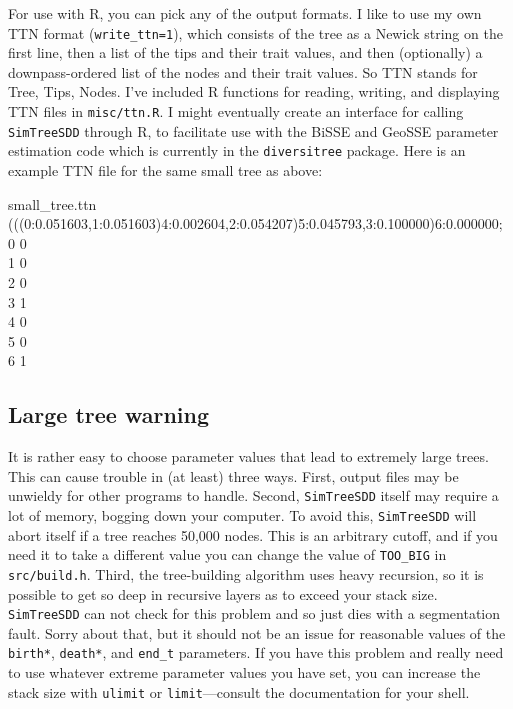 \documentclass[10pt]{article}
\begin{document}
For use with R, you can pick any of the output formats.
I like to use my own TTN format (\texttt{write\_ttn=1}), which consists of the tree as a Newick string on the first line, then a list of the tips and their trait values, and then (optionally) a downpass-ordered list of the nodes and their trait values.
So TTN stands for Tree, Tips, Nodes.
I've included R functions for reading, writing, and displaying TTN files in \texttt{misc/ttn.R}.
I might eventually create an interface for calling \texttt{SimTreeSDD} through R, to facilitate use with the BiSSE and GeoSSE parameter estimation code which is currently in the \texttt{diversitree} package.
Here is an example TTN file for the same small tree as above:
\begin{filesays}{small\_tree.ttn}
(((0:0.051603,1:0.051603)4:0.002604,2:0.054207)5:0.045793,3:0.100000)6:0.000000; \\
0    0	\\
1    0	\\
2    0	\\
3    1	\\
4    0	\\
5    0	\\
6    1
\end{filesays}


\subsection*{Large tree warning}

It is rather easy to choose parameter values that lead to extremely large trees.
This can cause trouble in (at least) three ways.
First, output files may be unwieldy for other programs to handle.
Second, \texttt{SimTreeSDD} itself may require a lot of memory, bogging down your computer.
To avoid this, \texttt{SimTreeSDD} will abort itself if a tree reaches 50,000 nodes.
This is an arbitrary cutoff, and if you need it to take a different value you can change the value of \texttt{TOO\_BIG} in \texttt{src/build.h}.
Third, the tree-building algorithm uses heavy recursion, so it is possible to get so deep in recursive layers as to exceed your stack size.
\texttt{SimTreeSDD} can not check for this problem and so just dies with a segmentation fault.  Sorry about that, but it should not be an issue for reasonable values of the \texttt{birth*}, \texttt{death*}, and \texttt{end\_t} parameters.
If you have this problem and really need to use whatever extreme parameter values you have set, you can increase the stack size with \texttt{ulimit} or \texttt{limit}---consult the documentation for your shell.
\end{document}
